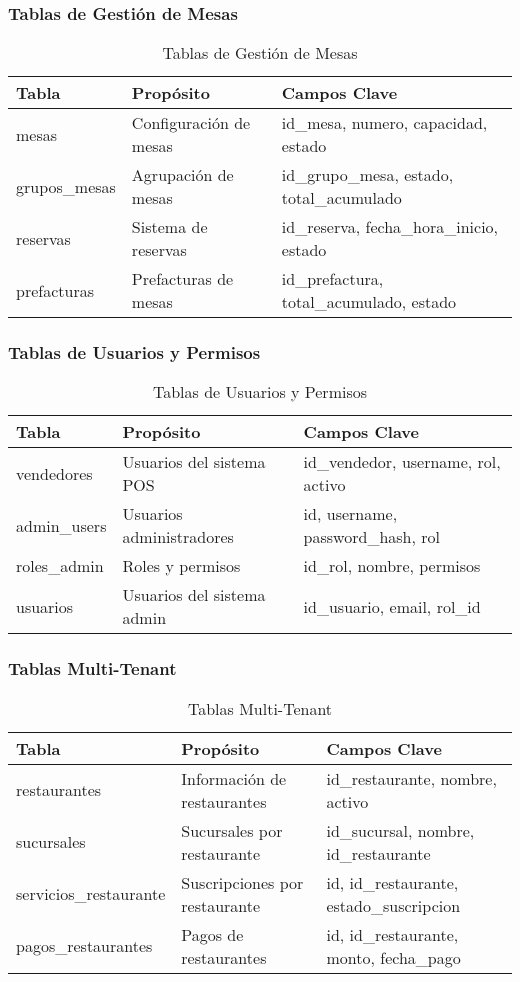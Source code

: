 \documentclass[12pt,a4paper]{article}
\begin{document}
\subsubsection{Tablas de Gestión de Mesas}
\begin{table}[H]
\centering
\begin{tabular}{@{}lll@{}}
\toprule
\textbf{Tabla} & \textbf{Propósito} & \textbf{Campos Clave} \\
\midrule
mesas & Configuración de mesas & id\_mesa, numero, capacidad, estado \\
grupos\_mesas & Agrupación de mesas & id\_grupo\_mesa, estado, total\_acumulado \\
reservas & Sistema de reservas & id\_reserva, fecha\_hora\_inicio, estado \\
prefacturas & Prefacturas de mesas & id\_prefactura, total\_acumulado, estado \\
\bottomrule
\end{tabular}
\caption{Tablas de Gestión de Mesas}
\end{table}

\subsubsection{Tablas de Usuarios y Permisos}
\begin{table}[H]
\centering
\begin{tabular}{@{}lll@{}}
\toprule
\textbf{Tabla} & \textbf{Propósito} & \textbf{Campos Clave} \\
\midrule
vendedores & Usuarios del sistema POS & id\_vendedor, username, rol, activo \\
admin\_users & Usuarios administradores & id, username, password\_hash, rol \\
roles\_admin & Roles y permisos & id\_rol, nombre, permisos \\
usuarios & Usuarios del sistema admin & id\_usuario, email, rol\_id \\
\bottomrule
\end{tabular}
\caption{Tablas de Usuarios y Permisos}
\end{table}

\subsubsection{Tablas Multi-Tenant}
\begin{table}[H]
\centering
\begin{tabular}{@{}lll@{}}
\toprule
\textbf{Tabla} & \textbf{Propósito} & \textbf{Campos Clave} \\
\midrule
restaurantes & Información de restaurantes & id\_restaurante, nombre, activo \\
sucursales & Sucursales por restaurante & id\_sucursal, nombre, id\_restaurante \\
servicios\_restaurante & Suscripciones por restaurante & id, id\_restaurante, estado\_suscripcion \\
pagos\_restaurantes & Pagos de restaurantes & id, id\_restaurante, monto, fecha\_pago \\
\bottomrule
\end{tabular}
\caption{Tablas Multi-Tenant}
\end{table}
\end{document}
